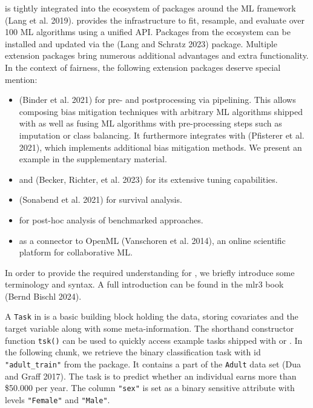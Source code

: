  is tightly integrated into the ecosystem of packages around the ML framework  (Lang et al. 2019).
 provides the infrastructure to fit, resample, and evaluate over 100 ML algorithms using a unified API.
Packages from the ecosystem can be installed and updated via the  (Lang and Schratz 2023) package.
Multiple extension packages bring numerous additional advantages and extra functionality.
In the context of fairness, the following extension packages deserve special mention:

\begin{itemize}
\tightlist
\item
   (Binder et al. 2021) for pre- and postprocessing via pipelining.
  This allows composing bias mitigation techniques with arbitrary ML algorithms shipped with  as well as fusing ML algorithms with pre-processing steps such as imputation or class balancing.
  It furthermore integrates with  (Pfisterer et al. 2021), which implements additional bias mitigation methods.
  We present an example in the supplementary material.
\item
   and  (Becker, Richter, et al. 2023) for its extensive tuning capabilities.
\item
   (Sonabend et al. 2021) for survival analysis.
\item
   for post-hoc analysis of benchmarked approaches.
\item
   as a connector to OpenML (Vanschoren et al. 2014), an online scientific platform for collaborative ML.
\end{itemize}

In order to provide the required understanding for , we briefly introduce some terminology and syntax.
A full introduction can be found in the mlr3 book (Bernd Bischl 2024).

A \texttt{Task} in  is a basic building block holding the data, storing covariates and the target variable along with some meta-information.
The shorthand constructor function \texttt{tsk()} can be used to quickly access example tasks shipped with  or .
In the following chunk, we retrieve the binary classification task with id \texttt{"adult\_train"} from the package.
It contains a part of the \texttt{Adult} data set (Dua and Graff 2017).
The task is to predict whether an individual earns more than \$50.000 per year.
The column \texttt{"sex"} is set as a binary sensitive attribute with levels \texttt{"Female"} and \texttt{"Male"}.


